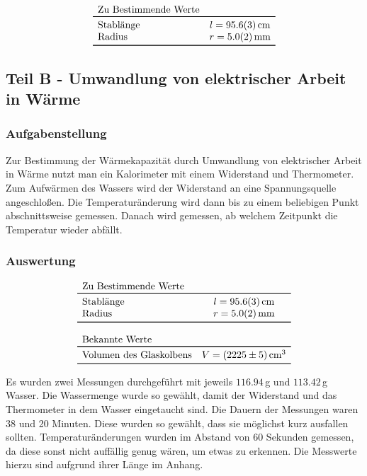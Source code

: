 \documentclass[11pt,a4paper]{article}
\begin{document}
$$
\begin{array}{lc}
	\multicolumn{1}{l}{\textrm{Zu Bestimmende Werte}} \\
	\toprule 
	\textrm{Stablänge} & l = 95.6(3)\,\textrm{cm} \\
	\textrm{Radius} & r = 5.0(2)\,\textrm{mm} \\
	\bottomrule 
\end{array}
$$


\pagebreak

\subsection{Teil B - Umwandlung von elektrischer Arbeit in Wärme}

\subsubsection{Aufgabenstellung}

Zur Bestimmung der W\"armekapazit\"at durch Umwandlung von elektrischer Arbeit in W\"arme nutzt man ein Kalorimeter mit einem Widerstand und Thermometer. Zum Aufw\"armen des Wassers wird der Widerstand an eine Spannungsquelle angeschlo\ss en. Die Temperatur\"anderung wird dann bis zu einem beliebigen Punkt abschnittsweise gemessen. Danach wird gemessen, ab welchem Zeitpunkt die Temperatur wieder abf\"allt.

\subsubsection{Auswertung}

$$
\begin{array}{lc}
	\multicolumn{1}{l}{\textrm{Zu Bestimmende Werte}} \\
	\toprule 
	\textrm{Stablänge} & l = 95.6(3)\,\textrm{cm} \\
	\textrm{Radius} & r = 5.0(2)\,\textrm{mm} \\
	\bottomrule \\
	\multicolumn{2}{l}{\textrm{Bekannte Werte}} \\
	\toprule
	\textrm{Volumen des Glaskolbens} & V = (2225 \pm 5)\,\textrm{cm}^3\\
	\bottomrule 
\end{array}
$$

Es wurden zwei Messungen durchgef\"uhrt mit jeweils $116.94\,$g und $113.42\,$g Wasser. Die Wassermenge wurde so gew\"ahlt, damit der Widerstand und das Thermometer in dem Wasser eingetaucht sind. Die Dauern der Messungen waren 38 und 20 Minuten. Diese wurden so gew\"ahlt, dass sie m\"oglichst kurz ausfallen sollten. Temperatur\"anderungen wurden im Abstand von 60 Sekunden gemessen, da diese sonst nicht auff\"allig genug w\"aren, um etwas zu erkennen. Die Messwerte hierzu sind aufgrund ihrer L\"ange im Anhang.
\end{document}
